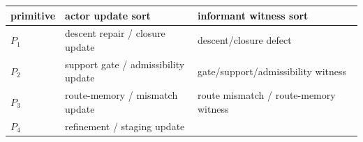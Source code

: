\documentclass[11pt]{article}
\theoremstyle{definition}
\begin{document}
\begin{longtable}[]{@{}lll@{}}
\toprule
\begin{minipage}[b]{0.08\columnwidth}\raggedright
primitive\strut
\end{minipage} & \begin{minipage}[b]{0.46\columnwidth}\raggedright
actor update sort\strut
\end{minipage} & \begin{minipage}[b]{0.37\columnwidth}\raggedright
informant witness sort\strut
\end{minipage}\tabularnewline
\midrule
\endhead
\begin{minipage}[t]{0.08\columnwidth}\raggedright
\(P_{1}\)\strut
\end{minipage} & \begin{minipage}[t]{0.46\columnwidth}\raggedright
descent repair / closure update\strut
\end{minipage} & \begin{minipage}[t]{0.37\columnwidth}\raggedright
descent/closure defect\strut
\end{minipage}\tabularnewline
\begin{minipage}[t]{0.08\columnwidth}\raggedright
\(P_{2}\)\strut
\end{minipage} & \begin{minipage}[t]{0.46\columnwidth}\raggedright
support gate / admissibility update\strut
\end{minipage} & \begin{minipage}[t]{0.37\columnwidth}\raggedright
gate/support/admissibility witness\strut
\end{minipage}\tabularnewline
\begin{minipage}[t]{0.08\columnwidth}\raggedright
\(P_{3}\)\strut
\end{minipage} & \begin{minipage}[t]{0.46\columnwidth}\raggedright
route-memory / mismatch update\strut
\end{minipage} & \begin{minipage}[t]{0.37\columnwidth}\raggedright
route mismatch / route-memory witness\strut
\end{minipage}\tabularnewline
\begin{minipage}[t]{0.08\columnwidth}\raggedright
\(P_{4}\)\strut
\end{minipage} & \begin{minipage}[t]{0.46\columnwidth}\raggedright
refinement / staging update\strut
\end{minipage} & \begin{minipage}[t]{0.37\columnwidth}\raggedright

\end{minipage}
\end{longtable}
\end{document}

